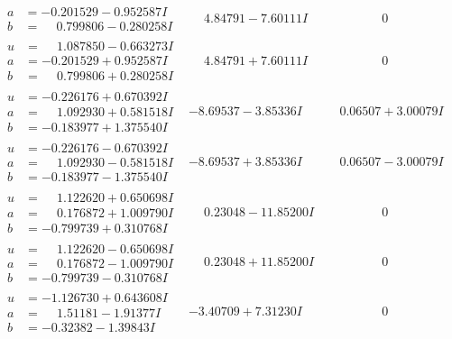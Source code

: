 \documentclass[1p]{elsarticle_modified}
\theoremstyle{definition}
\begin{document}
$$\begin{array}{c|c|c}
\begin{aligned}
a &= -0.201529 - 0.952587 I \\
b &= \phantom{-}0.799806 - 0.280258 I\end{aligned}
 & \phantom{-}4.84791 - 7.60111 I & \phantom{-0.000000 } 0 \\ \hline\begin{aligned}
u &= \phantom{-}1.087850 - 0.663273 I \\
a &= -0.201529 + 0.952587 I \\
b &= \phantom{-}0.799806 + 0.280258 I\end{aligned}
 & \phantom{-}4.84791 + 7.60111 I & \phantom{-0.000000 } 0 \\ \hline\begin{aligned}
u &= -0.226176 + 0.670392 I \\
a &= \phantom{-}1.092930 + 0.581518 I \\
b &= -0.183977 + 1.375540 I\end{aligned}
 & -8.69537 - 3.85336 I & \phantom{-}0.06507 + 3.00079 I \\ \hline\begin{aligned}
u &= -0.226176 - 0.670392 I \\
a &= \phantom{-}1.092930 - 0.581518 I \\
b &= -0.183977 - 1.375540 I\end{aligned}
 & -8.69537 + 3.85336 I & \phantom{-}0.06507 - 3.00079 I \\ \hline\begin{aligned}
u &= \phantom{-}1.122620 + 0.650698 I \\
a &= \phantom{-}0.176872 + 1.009790 I \\
b &= -0.799739 + 0.310768 I\end{aligned}
 & \phantom{-}0.23048 - 11.85200 I & \phantom{-0.000000 } 0 \\ \hline\begin{aligned}
u &= \phantom{-}1.122620 - 0.650698 I \\
a &= \phantom{-}0.176872 - 1.009790 I \\
b &= -0.799739 - 0.310768 I\end{aligned}
 & \phantom{-}0.23048 + 11.85200 I & \phantom{-0.000000 } 0 \\ \hline\begin{aligned}
u &= -1.126730 + 0.643608 I \\
a &= \phantom{-}1.51181 - 1.91377 I \\
b &= -0.32382 - 1.39843 I\end{aligned}
 & -3.40709 + 7.31230 I & \phantom{-0.000000 } 0\\

\end{array}$$
\end{document}
